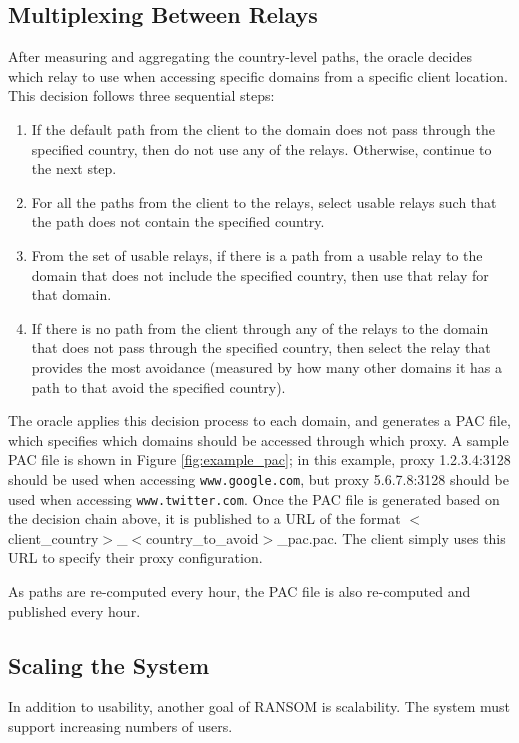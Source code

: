 \subsection{Multiplexing Between Relays}
\label{multiplex}
After measuring and aggregating the country-level paths, the oracle decides 
which relay to use when accessing specific domains from a specific client 
location.  This decision follows three sequential steps:

\begin{enumerate}
\item If the default path from the client to the domain does not pass through 
the specified country, then do not use any of the relays. Otherwise, continue 
to the next step.
\item For all the paths from the client to the relays, select usable relays 
such that the path does not contain the specified country.
\item From the set of usable relays, if there is a path from a 
usable relay to the domain that does not include the specified country, then 
use that relay for that domain.
\item If there is no path from the client through any of the relays to the domain 
that does not pass through the specified country, then select the relay 
that provides the most avoidance (measured by how many other domains it has 
a path to that avoid the specified country).
\end{enumerate}

The oracle applies this decision process to each domain, and generates a PAC 
file, which specifies which domains should be accessed through which proxy.  A 
sample PAC file is shown in Figure \ref{fig:example_pac}; in this example, proxy 
1.2.3.4:3128 should be used when accessing {\tt www.google.com}, but proxy 
5.6.7.8:3128 should be used when accessing {\tt www.twitter.com}.  Once the PAC 
file is generated based on the decision chain above, it is published to a URL 
of the format $<$client\_country$>$\_$<$country\_to\_avoid$>$\_pac.pac.  The client 
simply uses this URL to specify their proxy configuration.

As paths are re-computed every hour, the PAC file is also re-computed and 
published every hour.

\subsection{Scaling the System}
In addition to usability, another goal of RANSOM is scalability.  The system 
must support increasing numbers of users.  

